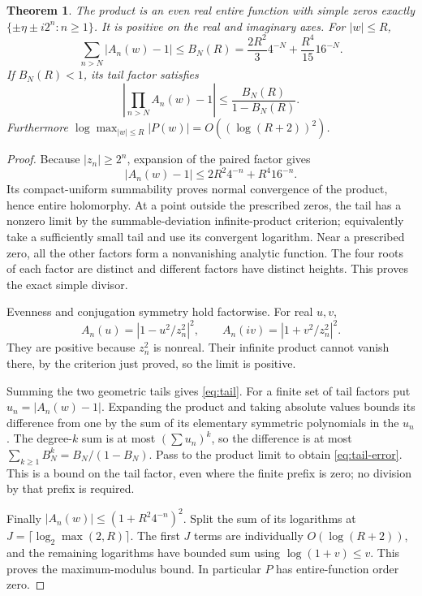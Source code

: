 \documentclass[11pt,a4paper]{article}
\newtheorem{theorem}{Theorem}[section]
\theoremstyle{definition}
\theoremstyle{remark}
\begin{document}
\begin{theorem}\label{thm:product}
The product is an even real entire function with simple zeros exactly
$\{\pm\eta\pm i2^n:n\ge1\}$. It is positive on the real and imaginary
axes. For $|w|\le R$,
\begin{equation}\label{eq:tail}
 \sum_{n>N}|A_n(w)-1|\le
 B_N(R)=\frac{2R^2}{3}4^{-N}+\frac{R^4}{15}16^{-N}.
\end{equation}
If $B_N(R)<1$, its tail factor satisfies
\begin{equation}\label{eq:tail-error}
 \left|\prod_{n>N}A_n(w)-1\right|\le\frac{B_N(R)}{1-B_N(R)}.
\end{equation}
Furthermore $\log\max_{|w|\le R}|P(w)|=O((\log(R+2))^2)$.
\end{theorem}
\begin{proof}
Because $|z_n|\ge2^n$, expansion of the paired factor gives
\[
 |A_n(w)-1|\le2R^2 4^{-n}+R^4 16^{-n}.
\]
Its compact-uniform summability proves normal convergence of the product,
hence entire holomorphy. At a point outside the prescribed zeros, the tail
has a nonzero limit by the summable-deviation infinite-product criterion;
equivalently take a sufficiently small tail and use its convergent logarithm.
Near a prescribed zero, all the other factors form a nonvanishing analytic
function. The four roots of each factor are distinct and different factors
have distinct heights. This proves the exact simple divisor.

Evenness and conjugation symmetry hold factorwise. For real $u,v$,
\[
 A_n(u)=|1-u^2/z_n^2|^2,\qquad A_n(iv)=|1+v^2/z_n^2|^2.
\]
They are positive because $z_n^2$ is nonreal. Their infinite product cannot
vanish there, by the criterion just proved, so the limit is positive.

Summing the two geometric tails gives \eqref{eq:tail}. For a finite set
of tail factors put $u_n=|A_n(w)-1|$. Expanding the product and taking
absolute values bounds its difference from one by the sum of its elementary
symmetric polynomials in the $u_n$. The degree-$k$ sum is at most
$(\sum u_n)^k$, so the difference is at most
$\sum_{k\ge1}B_N^k=B_N/(1-B_N)$. Pass to the product limit to obtain
\eqref{eq:tail-error}. This is a bound on the tail factor, even where the
finite prefix is zero; no division by that prefix is required.

Finally $|A_n(w)|\le(1+R^2 4^{-n})^2$. Split the sum of its logarithms
at $J=\lceil\log_2\max(2,R)\rceil$. The first $J$ terms are individually
$O(\log(R+2))$, and the remaining logarithms have bounded sum using
$\log(1+v)\le v$. This proves the maximum-modulus bound. In particular
$P$ has entire-function order zero.
\end{proof}
\end{document}
